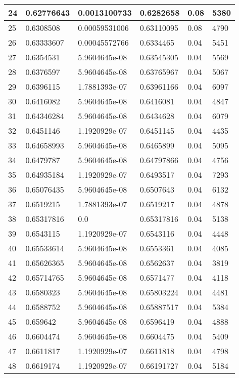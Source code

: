 \begin{longtable}{|l|l|l|l|l|l|}
24 & 0.62776643 & 0.0013100733 & 0.6282658 & 0.08 & 5380 \\ \hline 
25 & 0.6308508 & 0.00059531006 & 0.63110095 & 0.08 & 4790 \\ \hline 
26 & 0.63333607 & 0.00045572766 & 0.6334465 & 0.04 & 5451 \\ \hline 
27 & 0.6354531 & 5.9604645e-08 & 0.63545305 & 0.04 & 5569 \\ \hline 
28 & 0.6376597 & 5.9604645e-08 & 0.63765967 & 0.04 & 5067 \\ \hline 
29 & 0.6396115 & 1.7881393e-07 & 0.63961166 & 0.04 & 6097 \\ \hline 
30 & 0.6416082 & 5.9604645e-08 & 0.6416081 & 0.04 & 4847 \\ \hline 
31 & 0.64346284 & 5.9604645e-08 & 0.6434628 & 0.04 & 6079 \\ \hline 
32 & 0.6451146 & 1.1920929e-07 & 0.6451145 & 0.04 & 4435 \\ \hline 
33 & 0.64658993 & 5.9604645e-08 & 0.6465899 & 0.04 & 5095 \\ \hline 
34 & 0.6479787 & 5.9604645e-08 & 0.64797866 & 0.04 & 4756 \\ \hline 
35 & 0.64935184 & 1.1920929e-07 & 0.6493517 & 0.04 & 7293 \\ \hline 
36 & 0.65076435 & 5.9604645e-08 & 0.6507643 & 0.04 & 6132 \\ \hline 
37 & 0.6519215 & 1.7881393e-07 & 0.6519217 & 0.04 & 4878 \\ \hline 
38 & 0.65317816 & 0.0 & 0.65317816 & 0.04 & 5138 \\ \hline 
39 & 0.6543115 & 1.1920929e-07 & 0.6543116 & 0.04 & 4448 \\ \hline 
40 & 0.65533614 & 5.9604645e-08 & 0.6553361 & 0.04 & 4085 \\ \hline 
41 & 0.65626365 & 5.9604645e-08 & 0.6562637 & 0.04 & 3819 \\ \hline 
42 & 0.65714765 & 5.9604645e-08 & 0.6571477 & 0.04 & 4118 \\ \hline 
43 & 0.6580323 & 5.9604645e-08 & 0.65803224 & 0.04 & 4481 \\ \hline 
44 & 0.6588752 & 5.9604645e-08 & 0.65887517 & 0.04 & 5384 \\ \hline 
45 & 0.659642 & 5.9604645e-08 & 0.6596419 & 0.04 & 4888 \\ \hline 
46 & 0.6604474 & 5.9604645e-08 & 0.6604475 & 0.04 & 5409 \\ \hline 
47 & 0.6611817 & 1.1920929e-07 & 0.6611818 & 0.04 & 4798 \\ \hline 
48 & 0.6619174 & 1.1920929e-07 & 0.66191727 & 0.04 & 5184 \\ \hline 

\end{longtable}
